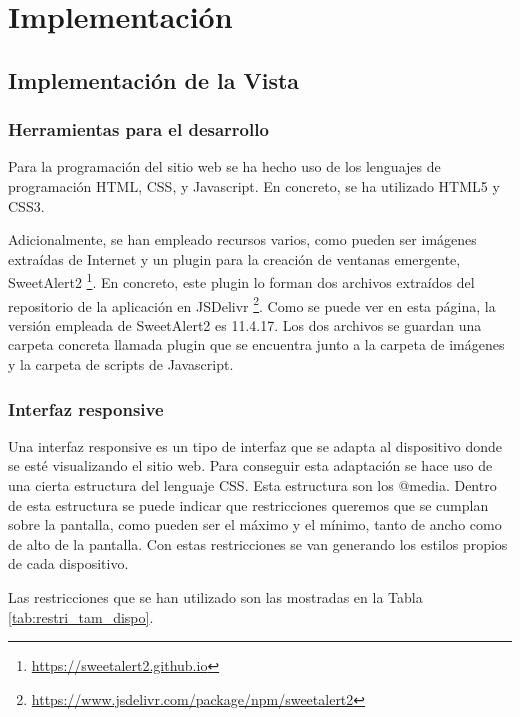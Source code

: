 \chapter{Implementación}

\section{Implementación de la Vista}

\subsection{Herramientas para el desarrollo}

Para la programación del sitio web se ha hecho uso de los lenguajes de programación HTML, CSS, y Javascript. En concreto, se ha utilizado HTML5 y CSS3.

Adicionalmente, se han empleado recursos varios, como pueden ser imágenes extraídas de Internet y un plugin para la creación de ventanas emergente, SweetAlert2 \footnote{\url{https://sweetalert2.github.io}}. En concreto, este plugin lo forman dos archivos extraídos del repositorio de la aplicación en JSDelivr \footnote{\url{https://www.jsdelivr.com/package/npm/sweetalert2}}. Como se puede ver en esta página, la versión empleada de SweetAlert2 es 11.4.17. Los dos archivos se guardan una carpeta concreta llamada plugin que se encuentra junto a la carpeta de imágenes y la carpeta de scripts de Javascript.

\subsection{Interfaz responsive}

Una interfaz responsive es un tipo de interfaz que se adapta al dispositivo donde se esté visualizando el sitio web. Para conseguir esta adaptación se hace uso de una cierta estructura del lenguaje CSS. Esta estructura son los @media. Dentro de esta estructura se puede indicar que restricciones queremos que se cumplan sobre la pantalla, como pueden ser el máximo y el mínimo, tanto de ancho como de alto de la pantalla. Con estas restricciones se van generando los estilos propios de cada dispositivo.

Las restricciones que se han utilizado son las mostradas en la Tabla \ref{tab:restri_tam_dispo}.

